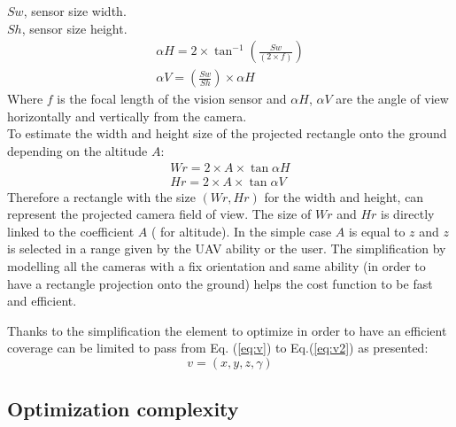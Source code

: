 \noindent $Sw$, sensor size width. \\
$Sh$, sensor size height.
\begin{equation} 
  \begin{split}
	\alpha H = 2\times \tan^{-1} (\frac{Sw}{(2\times f)}  ) 
    \\
	\alpha V = (\frac{Sw}{Sh} )\times \alpha H
  \end{split}
\end{equation}
Where $f$ is the focal length of the vision sensor and 
$\alpha H$, $\alpha V$ are the angle of view horizontally and vertically from the camera.\\
To estimate the width and height size of the projected rectangle onto the ground depending on the altitude $A$:
\begin{equation}\label{eq:WrHr}
	\begin{split}
    	Wr= 2\times A\times\tan \alpha H
        \\
        Hr= 2\times A\times\tan \alpha V
     \end{split}
\end{equation} 
Therefore a rectangle with the size $(Wr, Hr)$ for the width and height, can represent the projected  camera field of view. The size of $Wr$ and $Hr$ is directly linked to the coefficient $A$ ( for altitude). In the simple case $A $ is equal to  $z$ and $z$ is selected in  a range given by the UAV ability or the user. The simplification by modelling all the cameras with a fix orientation and same ability (in order to have a rectangle projection onto the ground) helps the cost function to be fast and efficient. 

Thanks to the simplification the element to optimize in order to have an efficient coverage can be limited to pass from Eq. (\ref{eq:v}) to  Eq.(\ref{eq:v2})  as presented: 
\begin{equation}\label{eq:v2}
v=(x,y,z,\gamma )
\end{equation}

 \subsection{Optimization complexity}
 

